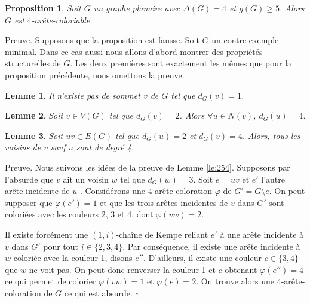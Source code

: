 \documentclass[10pt,a4paper]{article}
\newtheorem{proposition}{Proposition}
\newtheorem{lemme}{Lemme}
\newcommand{\ep}{{\hfill $\square$}}
\begin{document}

\begin{proposition}
Soit $G$ un graphe planaire avec $\Delta(G) = 4$ et $g(G) \geq 5$. Alors $G$ est $4$-arête-coloriable.
\end{proposition}

Preuve. Supposons que la proposition est fausse. Soit $G$ un contre-exemple minimal. Dans ce cas aussi nous allons d'abord montrer des propriétés structurelles de $G$. Les deux premières sont exactement les mêmes que pour la proposition précédente, nous omettons la preuve.

\begin{lemme}
Il n'existe pas de sommet $v$ de $G$ tel que $d_G(v) = 1$.
\label{le:14}
\end{lemme}

\begin{lemme}
Soit $v \in V(G)$ tel que $d_G(v) = 2$. Alors $\forall u \in N(v)$, $d_G(u) = 4$.
\label{le:23}
\end{lemme} 


\begin{lemme}
Soit $uv \in E(G)$ tel que $d_G(u) = 2$ et $d_G(v) = 4$. Alors, tous les voisins de $v$ sauf $u$ sont de degré 4.
\label{le:243}
\end{lemme}

Preuve. Nous suivons les idées de la preuve de Lemme \ref{le:254}.
Supposons par l'absurde que $v$ ait un voisin $w$ tel que $d_G(w) = 3$. Soit $e = uv$ et $e'$ l'autre arête incidente de $u$ . Considérons une $4$-arête-coloration $\varphi$ de $G' = G \setminus e$. On peut supposer que $\varphi(e') = 1$ et que les trois arêtes incidentes de $v$ dans $G'$ sont coloriées avec les couleurs 2, 3 et 4, dont $\varphi(vw) = 2$.

Il existe forcément une $(1,i)$-chaîne de Kempe reliant $e'$ à une arête incidente à $v$ dans $G'$ pour tout $i \in \{2,3,4\}$. Par conséquence, il existe une arête incidente à $w$ coloriée avec la couleur 1, disons $e''$. D'ailleurs, il existe une couleur $c\in \{3,4\}$ que $w$ ne voit pas. On peut donc renverser la couleur 1 et $c$ obtenant $\varphi(e'') = 4$ ce qui permet de colorier $\varphi(vw) = 1$ et $\varphi(e) = 2$. On trouve alors une 4-arête-coloration de $G$ ce qui est absurde.
\ep
\end{document}
